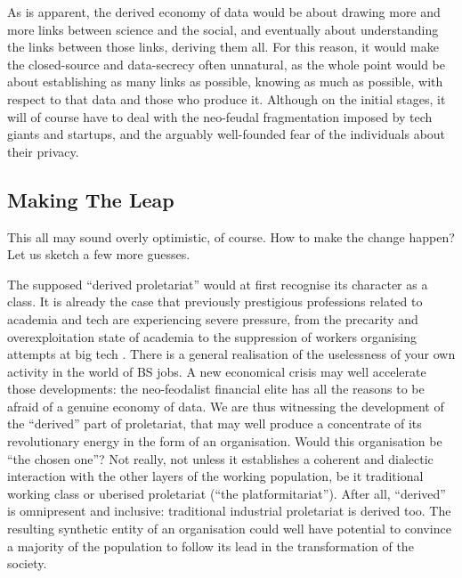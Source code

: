 \documentclass{article}
\begin{document}
As is apparent, the derived economy of data would be about drawing more and more links between science and the social, and eventually about understanding the links between those links, deriving them all. For this reason, it would make the closed-source and data-secrecy often unnatural, as the whole point would be about establishing as many links as possible, knowing as much as possible, with respect to that data and those who produce it. Although on the initial stages, it will of course have to deal with the neo-feudal fragmentation imposed by tech giants and startups, and the arguably well-founded fear of the individuals about their privacy.


\subsection*{Making The Leap}

This all may sound overly optimistic, of course. How to make the change happen? Let
us sketch a few more guesses.

The supposed ``derived proletariat'' would at first
recognise its character as a class. It is already the case that previously prestigious
professions related to academia and tech are experiencing severe pressure, from
the precarity and overexploitation state of academia \cite{ACADANON} to the suppression
of workers organising attempts at big tech \cite{GOOG}. There is a general \cite{GRAEBER}
realisation of the uselessness of your own activity in the world of BS jobs. A new economical crisis may
well accelerate those developments: the neo-feodalist financial elite has all the reasons to
be afraid of a genuine economy of data. We are thus witnessing the development of the ``derived''
part of proletariat, that may well produce a concentrate of its revolutionary energy in the form of an organisation. Would this organisation be ``the chosen one''? Not really, not unless it
establishes a coherent and dialectic interaction with the other layers of the working population,
be it traditional working class or uberised proletariat (``the platformitariat''). After all,
``derived'' is omnipresent and inclusive: traditional industrial proletariat is derived too.
The resulting synthetic entity
of an organisation could well have potential to convince a majority of the population to
follow its lead in the transformation of the society.
\end{document}
